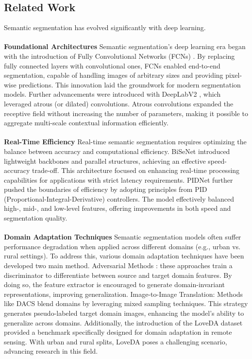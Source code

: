 \documentclass{article}
\begin{document}
\begin{multicols}{2}
		\section{Related Work}
		Semantic segmentation has evolved significantly with deep learning. 
		\\
		\\
		\textbf{Foundational Architectures}
		Semantic segmentation's deep learning era began with the introduction of Fully Convolutional Networks (FCNs) \cite{long2015fcn}. By replacing fully connected layers with convolutional ones, FCNs enabled end-to-end segmentation, capable of handling images of arbitrary sizes and providing pixel-wise predictions. This innovation laid the groundwork for modern segmentation models.
		Further advancements were introduced with DeepLabV2 \cite{chen2018deeplab}, which leveraged atrous (or dilated) convolutions. Atrous convolutions expanded the receptive field without increasing the number of parameters, making it possible to aggregate multi-scale contextual information efficiently.
		\\
		\\
		\textbf{Real-Time Efficiency}
		Real-time semantic segmentation requires optimizing the balance between accuracy and computational efficiency. BiSeNet \cite{yu2018bisenet} introduced lightweight backbones and parallel structures, achieving an effective speed-accuracy trade-off. This architecture focused on enhancing real-time processing capabilities for applications with strict latency requirements. PIDNet \cite{pidnet2023} further pushed the boundaries of efficiency by adopting principles from PID (Proportional-Integral-Derivative) controllers. The model effectively balanced high-, mid-, and low-level features, offering improvements in both speed and segmentation quality.
		\\
		\\
		\textbf{Domain Adaptation Techniques}
		Semantic segmentation models often suffer performance degradation when applied across different domains (e.g., urban vs. rural settings). To address this, various domain adaptation techniques have been developed two main method. Adversarial Methods \cite{tsai2018learning}: these approaches train a discriminator to differentiate between source and target domain features. By doing so, the feature extractor is encouraged to generate domain-invariant representations, improving generalization. Image-to-Image Translation: Methods like DACS \cite{tranheden2021dacs} blend domains by leveraging mixed sampling techniques. This strategy generates pseudo-labeled target domain images, enhancing the model's ability to generalize across domains.
		Additionally, the introduction of the LoveDA dataset \cite{loveda2021} provided a benchmark specifically designed for domain adaptation in remote sensing. With urban and rural splits, LoveDA poses a challenging scenario, advancing research in this field.


\end{multicols}
\end{document}
